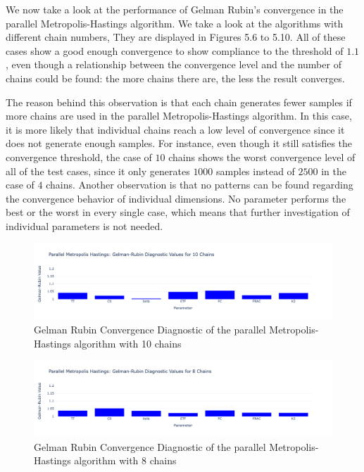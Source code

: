 We now take a look at the performance of Gelman Rubin's convergence in the parallel Metropolis-Hastings algorithm. We take a look at the algorithms with different chain numbers, They are displayed in Figures 5.6 to 5.10. All of these cases show a good enough convergence to show compliance to the threshold of $1.1$, even though a relationship between the convergence level and the number of chains could be found: the more chains there are, the less the result converges.

The reason behind this observation is that each chain generates fewer samples if more chains are used in the parallel Metropolis-Hastings algorithm. In this case, it is more likely that individual chains reach a low level of convergence since it does not generate enough samples. For instance, even though it still satisfies the convergence threshold, the case of $10$ chains shows the worst convergence level of all of the test cases, since it only generates $1000$ samples instead of $2500$ in the case of $4$ chains. Another observation is that no patterns can be found regarding the convergence behavior of individual dimensions. No parameter performs the best or the worst in every single case, which means that further investigation of individual parameters is not needed.

\begin{figure}[H]
    \centering
    \includegraphics[width=1\textwidth]{figures/parallel_mh/GR_10.png}
    \captionsetup{width=.8\textwidth}
    \caption{Gelman Rubin Convergence Diagnostic of the parallel Metropolis-Hastings algorithm with 10 chains}
    \label{fig:enter-label}
\end{figure}

\begin{figure}[H]
    \centering
    \includegraphics[width=1\textwidth]{figures/parallel_mh/GR_8.png}
    \captionsetup{width=.8\textwidth}
    \caption{Gelman Rubin Convergence Diagnostic of the parallel Metropolis-Hastings algorithm with 8 chains}
    \label{fig:enter-label}
\end{figure}

